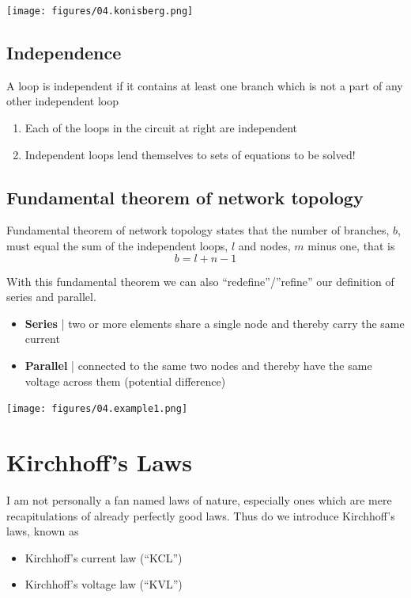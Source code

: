 \documentclass[11pt]{book}
\begin{document}
\begin{center}
	\texttt{[image: figures/04.konisberg.png]}
\end{center}



\subsection{Independence}
A loop is independent if it contains at least one branch which is not a part of any other independent loop
\begin{enumerate}
	\item Each of the loops in the circuit at right are independent 
	\item Independent loops lend themselves to sets of equations to be solved!
\end{enumerate}

\subsection{Fundamental theorem of network topology}
Fundamental theorem of network topology states that the number of branches, $b$, must equal the sum of the independent loops, $l$ and nodes, $m$ minus one, that is
\begin{equation}
	b = l + n - 1
\end{equation}

With this fundamental theorem we can also “redefine”/”refine” our definition of series and parallel.
\begin{itemize}
	\item \textbf{Series} | two or more elements share a single node and thereby carry the same current
	\item \textbf{Parallel} | connected to the same two nodes and thereby have the same voltage across them (potential difference)
\end{itemize}

\begin{center}
	\texttt{[image: figures/04.example1.png]}
\end{center}

 
\newpage
\section{Kirchhoff's Laws}
I am not personally a fan named laws of nature, especially ones which are mere recapitulations of already perfectly good laws. Thus do we introduce Kirchhoff’s laws, known as 
\begin{itemize}
	\item Kirchhoff’s current law (``KCL'') 
	\item Kirchhoff’s voltage law (``KVL'')  
\end{itemize}
	
\end{document}
